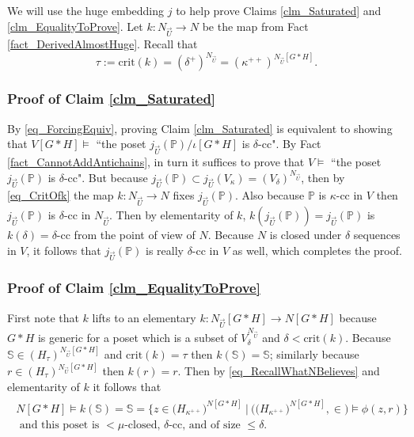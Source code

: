 \documentclass{amsart}
\begin{document}
We will use the huge embedding $j$ to help prove Claims \ref{clm_Saturated} and \ref{clm_EqualityToProve}.  Let 
$k: N_{\vec{U}} \to N$ be the map from Fact \ref{fact_DerivedAlmostHuge}.  Recall that
\begin{equation}\label{eq_CritOfk}
\tau:= \text{crit}(k) = (\delta^+)^{N_{\vec{U}}} = (\kappa^{++})^{N_{\vec{U}}[G*H]}.
\end{equation}


\subsubsection{Proof of Claim \ref{clm_Saturated}}

By \eqref{eq_ForcingEquiv}, proving Claim \ref{clm_Saturated} is equivalent to showing that $V[G*H] \models$ ``the poset $j_{\vec{U}}(\mathbb{P})/\iota[G*H]$ is $\delta$-cc".  By Fact \ref{fact_CannotAddAntichains}, in turn it suffices to prove that $V \models$ ``the poset $j_{\vec{U}}(\mathbb{P})$ is $\delta$-cc".  But because $j_{\vec{U}}(\mathbb{P}) \subset j_{\vec{U}}(V_\kappa) = (V_\delta)^{N_{\vec{U}}}$, then by \eqref{eq_CritOfk} the map $k: N_{\vec{U}} \to N$ fixes $j_{\vec{U}}(\mathbb{P})$.  Also because $\mathbb{P}$ is $\kappa$-cc in $V$ then $j_{\vec{U}}(\mathbb{P})$ is $\delta$-cc in $N_{\vec{U}}$.  Then by elementarity of $k$, $k(j_{\vec{U}}(\mathbb{P})) = j_{\vec{U}}(\mathbb{P})$ is $k(\delta) = \delta$-cc from the point of view of $N$.  Because $N$ is closed under $\delta$ sequences in $V$, it follows that $j_{\vec{U}}(\mathbb{P})$ is really $\delta$-cc in $V$ as well, which completes the proof.




\subsubsection{Proof of Claim \ref{clm_EqualityToProve}}

First note that $k$ lifts to an elementary $k: N_{\vec{U}}[G*H] \to N[G*H]$ because $G*H$ is generic for a poset which is a subset of $V_\delta^{N_{\vec{U}}}$ and $\delta < \text{crit}(k)$.  Because $\mathbb{S} \in (H_\tau)^{N_{\vec{U}}[G*H]}$ and $\text{crit}(k) = \tau$ then $k(\mathbb{S}) = \mathbb{S}$; similarly because $r \in (H_\tau)^{N_{\vec{U}}[G*H]}$ then $k(r) = r$.  Then by \eqref{eq_RecallWhatNBelieves} and elementarity of $k$ it follows that
\begin{align}\label{eq_HugeBelieves}
\begin{split}
N[G*H] \models k(\mathbb{S}) = \mathbb{S} = \{ z \in \big( H_{\kappa^{++}}\big)^{N[G*H]} \ | \  \Big( \big( H_{\kappa^{++}}\big)^{N[G*H]}, \in \Big) \models \phi(z,r)   \} \\
\text{ and this poset is } <\mu \text{-closed, } \delta\text{-cc, and of size } \le \delta.
\end{split}
\end{align}
\end{document}
